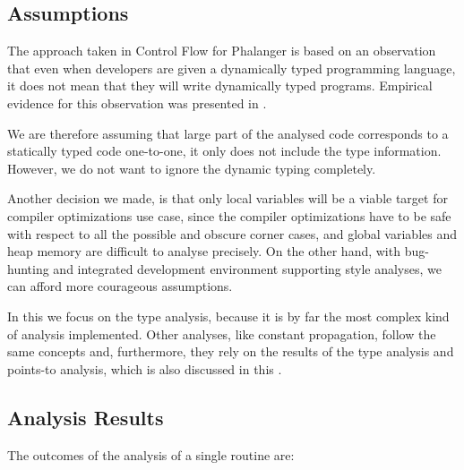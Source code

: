         \subsection{Assumptions}        
        The approach taken in Control Flow for Phalanger is based on an 
        observation that even when developers are given a dynamically typed 
        programming language, it does not mean that they will write 
        dynamically typed programs. Empirical evidence for this 
        observation was presented in \cite{walker1996type}. 
        
        We are therefore assuming that large part of the analysed 
        code corresponds to a statically typed code one-to-one, 
        it only does not include the type information. However, 
        we do not want to ignore the dynamic typing completely.

        Another decision we made, is that only local variables 
        will be a viable target for compiler optimizations use 
        case, since the compiler optimizations have to be safe with 
        respect to all the possible and obscure corner cases, 
        and global variables and heap memory are difficult to 
        analyse precisely. On the other hand, with bug-hunting and 
        integrated development environment supporting style 
        analyses, we can afford more courageous assumptions.
        
        In this \wsection{} we focus on the type analysis, because 
        it is by far the most complex kind of analysis implemented. 
        Other analyses, like constant propagation, follow the same 
        concepts and, furthermore, they rely on the results of the 
        type analysis and points-to analysis, which is 
        also discussed in this \wsection{}.
        
        \subsection{Analysis Results}
        
        The outcomes of the analysis of a single routine are:
        
